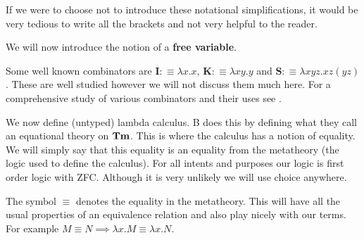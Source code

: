 If we were to choose not to introduce these notational simplifications, it would be very tedious to write all the brackets and not very helpful to the reader.

We will now introduce the notion of a {\bf free variable}.


\begin{example}
Some well known combinators are $\mathbf{I} :\equiv \lambda x . x$, $\mathbf{K} :\equiv \lambda x y .y$ and $\mathbf{S}:\equiv \lambda x y z . xz(yz)$. These are well studied however we will not discuss them much here. For a comprehensive study of various combinators and their uses see \cite{smullyan2012mock}.
\end{example}

We now define (untyped) lambda calculus. B does this by defining what they call an equational theory on $\mathbf{Tm}$. This is where the calculus has a notion of equality. We will simply say that this equality is an equality from the metatheory (the logic used to define the calculus). For all intents and purposes our logic is first order logic with ZFC. Although it is very unlikely we will use choice anywhere.

\begin{defin}
    The symbol $\equiv$ denotes the equality in the metatheory. This will have all the usual properties of an equivalence relation and also play nicely with our terms. For example $M \equiv N \implies \lambda x . M \equiv \lambda x . N$.
\end{defin}

